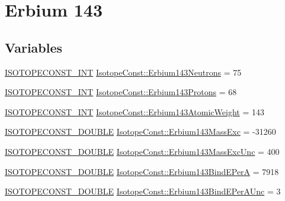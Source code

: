 \hypertarget{group___isotope_const-_erbium-_er143}{}\section{Erbium 143}
\label{group___isotope_const-_erbium-_er143}
\subsection*{Variables}
\begin{DoxyCompactItemize}
\item 
\mbox{\hyperlink{group___isotope_const-_macros_ga5f18360b3e99483a35c32d789e62621c}{I\+S\+O\+T\+O\+P\+E\+C\+O\+N\+S\+T\+\_\+\+I\+NT}} \mbox{\hyperlink{group___isotope_const-_erbium-_er143_ga121621c20c222a4c5c81b8ebf7292e2f}{Isotope\+Const\+::\+Erbium143\+Neutrons}} = 75
\item 
\mbox{\hyperlink{group___isotope_const-_macros_ga5f18360b3e99483a35c32d789e62621c}{I\+S\+O\+T\+O\+P\+E\+C\+O\+N\+S\+T\+\_\+\+I\+NT}} \mbox{\hyperlink{group___isotope_const-_erbium-_er143_gac6292154760b69fa8f98cb9a478edf17}{Isotope\+Const\+::\+Erbium143\+Protons}} = 68
\item 
\mbox{\hyperlink{group___isotope_const-_macros_ga5f18360b3e99483a35c32d789e62621c}{I\+S\+O\+T\+O\+P\+E\+C\+O\+N\+S\+T\+\_\+\+I\+NT}} \mbox{\hyperlink{group___isotope_const-_erbium-_er143_ga9ebed6cc8d414855385d856be282c641}{Isotope\+Const\+::\+Erbium143\+Atomic\+Weight}} = 143
\item 
\mbox{\hyperlink{group___isotope_const-_macros_ga8f45a7272ce02c0b4c65c44636ed719a}{I\+S\+O\+T\+O\+P\+E\+C\+O\+N\+S\+T\+\_\+\+D\+O\+U\+B\+LE}} \mbox{\hyperlink{group___isotope_const-_erbium-_er143_ga1b634b0a46b8b4722d2a2af606a566b3}{Isotope\+Const\+::\+Erbium143\+Mass\+Exc}} = -\/31260
\item 
\mbox{\hyperlink{group___isotope_const-_macros_ga8f45a7272ce02c0b4c65c44636ed719a}{I\+S\+O\+T\+O\+P\+E\+C\+O\+N\+S\+T\+\_\+\+D\+O\+U\+B\+LE}} \mbox{\hyperlink{group___isotope_const-_erbium-_er143_ga1aa28ebec5ebc9f93c83a8717523c8b1}{Isotope\+Const\+::\+Erbium143\+Mass\+Exc\+Unc}} = 400
\item 
\mbox{\hyperlink{group___isotope_const-_macros_ga8f45a7272ce02c0b4c65c44636ed719a}{I\+S\+O\+T\+O\+P\+E\+C\+O\+N\+S\+T\+\_\+\+D\+O\+U\+B\+LE}} \mbox{\hyperlink{group___isotope_const-_erbium-_er143_ga4b2e3e1f89dbd0a7e85429b35bbb8cc3}{Isotope\+Const\+::\+Erbium143\+Bind\+E\+PerA}} = 7918
\item 
\mbox{\hyperlink{group___isotope_const-_macros_ga8f45a7272ce02c0b4c65c44636ed719a}{I\+S\+O\+T\+O\+P\+E\+C\+O\+N\+S\+T\+\_\+\+D\+O\+U\+B\+LE}} \mbox{\hyperlink{group___isotope_const-_erbium-_er143_ga95194bf19ed36b6551776fc9acc899a3}{Isotope\+Const\+::\+Erbium143\+Bind\+E\+Per\+A\+Unc}} = 3

\end{DoxyCompactItemize}
